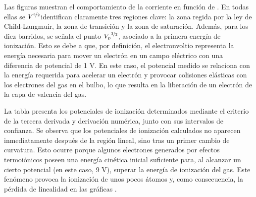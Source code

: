 Las figuras \ut{\ref{fig:pot1} - \ref{fig:pot10}} muestran el comportamiento de la corriente en función de . En todas ellas se $V^{\nicefrac{3}{2}}$identifican claramente tres regiones clave: la zona regida por la ley de Child-Langmuir, la zona de transición y la zona de saturación. Además, para los diez barridos, se señala el punto ${V_{p}}^{\nicefrac{3}{2}}$, asociado a la primera energía de ionización. Esto se debe a que, por definición, el electronvoltio representa la energía necesaria para mover un electrón en un campo eléctrico con una diferencia de potencial de 1 V. En este caso, el potencial medido se relaciona con la energía requerida para acelerar un electrón y provocar colisiones elásticas con los electrones del gas en el bulbo, lo que resulta en la liberación de un electrón de la capa de valencia del gas.

La tabla \ut{\ref{tab:pots}} presenta los potenciales de ionización determinados mediante el criterio de la tercera derivada y derivación numérica, junto con sus intervalos de confianza. Se observa que los potenciales de ionización calculados no aparecen inmediatamente después de la región lineal, sino tras un primer cambio de curvatura. Esto ocurre porque algunos electrones generados por efectos termoiónicos poseen una energía cinética inicial suficiente para, al alcanzar un cierto potencial (en este caso, 9 V), superar la energía de ionización del gas. Este fenómeno provoca la ionización de unos pocos átomos y, como consecuencia, la pérdida de linealidad en las gráficas \ut{\ref{fig:pot1} - \ref{fig:pot10}}.


